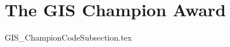 \documentclass[class=book , crop=false]{standalone}
\begin{document}
\section{The GIS Champion Award}
{GIS_ChampionCodeSubsection.tex}
\end{document}
